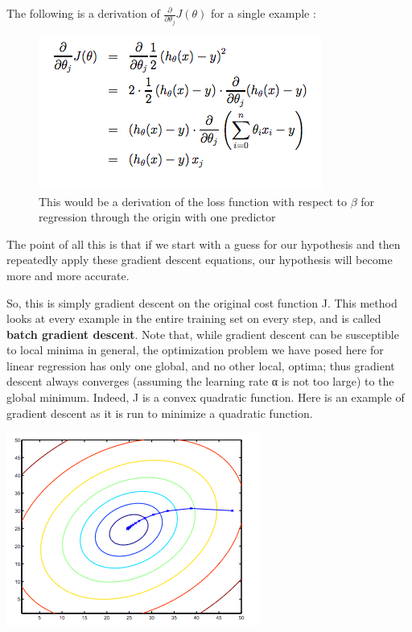 \documentclass[
]{book}
\begin{document}
The following is a derivation of \(\frac {\partial}{\partial \theta_j}J(\theta)\) for a single example :

\begin{figure}
\centering
\includegraphics{Gradient_descent_for_linear_regression_graph_1.png}
\caption{{This would be a derivation of the loss function with respect to \(\beta\) for regression through the origin with one predictor}}
\end{figure}

The point of all this is that if we start with a guess for our hypothesis and then repeatedly apply these gradient descent equations, our hypothesis will become more and more accurate.

So, this is simply gradient descent on the original cost function J. This method looks at every example in the entire training set on every step, and is called \textbf{batch gradient descent}. Note that, while gradient descent can be susceptible to local minima in general, the optimization problem we have posed here for linear regression has only one global, and no other local, optima; thus gradient descent always converges (assuming the learning rate α is not too large) to the global minimum. Indeed, J is a convex quadratic function. Here is an example of gradient descent as it is run to minimize a quadratic function.

\includegraphics{Gradient_descent_for_linear_regression_graph_2.png}
\end{document}
